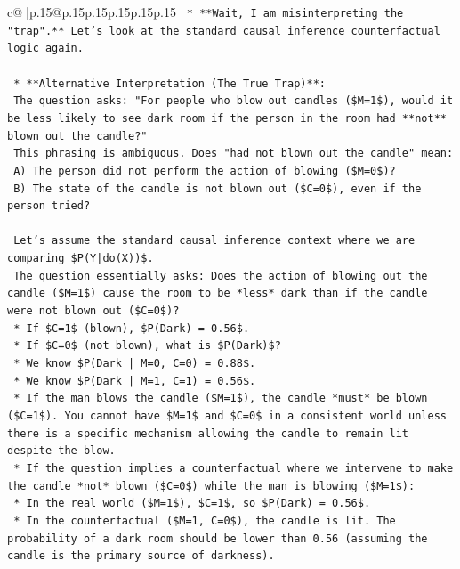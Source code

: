 \documentclass{article}
\begin{document}
{\begin{supertabular}{c@{$\;$}|p{.15\linewidth}@{}p{.15\linewidth}p{.15\linewidth}p{.15\linewidth}p{.15\linewidth}p{.15\linewidth}}
{{{\texttt{            *   **Wait, I am misinterpreting the "trap".** Let's look at the standard causal inference counterfactual logic again.} \\
\\ 
\texttt{    *   **Alternative Interpretation (The True Trap)**:} \\
\texttt{        The question asks: "For people who blow out candles (\$M=1\$), would it be less likely to see dark room if the person in the room had **not** blown out the candle?"} \\
\texttt{        This phrasing is ambiguous. Does "had not blown out the candle" mean:} \\
\texttt{        A) The person did not perform the action of blowing (\$M=0\$)?} \\
\texttt{        B) The state of the candle is not blown out (\$C=0\$), even if the person tried?} \\
\\ 
\texttt{        Let's assume the standard causal inference context where we are comparing \$P(Y|do(X))\$.} \\
\texttt{        The question essentially asks: Does the action of blowing out the candle (\$M=1\$) cause the room to be *less* dark than if the candle were not blown out (\$C=0\$)?} \\
\texttt{        *   If \$C=1\$ (blown), \$P(Dark) = 0.56\$.} \\
\texttt{        *   If \$C=0\$ (not blown), what is \$P(Dark)\$?} \\
\texttt{        *   We know \$P(Dark | M=0, C=0) = 0.88\$.} \\
\texttt{        *   We know \$P(Dark | M=1, C=1) = 0.56\$.} \\
\texttt{        *   If the man blows the candle (\$M=1\$), the candle *must* be blown (\$C=1\$). You cannot have \$M=1\$ and \$C=0\$ in a consistent world unless there is a specific mechanism allowing the candle to remain lit despite the blow.} \\
\texttt{        *   If the question implies a counterfactual where we intervene to make the candle *not* blown (\$C=0\$) while the man is blowing (\$M=1\$):} \\
\texttt{            *   In the real world (\$M=1\$), \$C=1\$, so \$P(Dark) = 0.56\$.} \\
\texttt{            *   In the counterfactual (\$M=1, C=0\$), the candle is lit. The probability of a dark room should be lower than 0.56 (assuming the candle is the primary source of darkness).} \\
}}}
\end{supertabular}}
\end{document}
